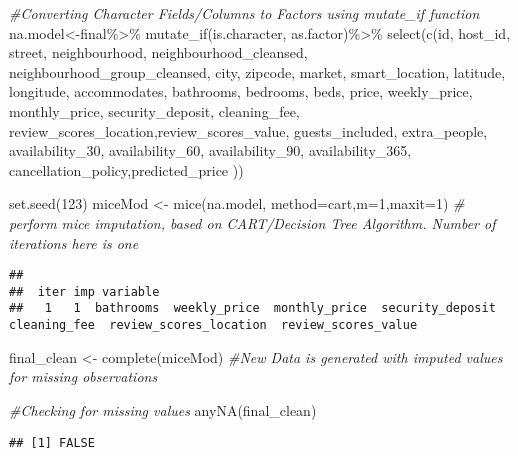 \documentclass[
]{article}
\newenvironment{Shaded}{\begin{snugshade}}{\end{snugshade}}
\newcommand{\AttributeTok}[1]{\textcolor[rgb]{0.77,0.63,0.00}{#1}}
\newcommand{\CommentTok}[1]{\textcolor[rgb]{0.56,0.35,0.01}{\textit{#1}}}
\newcommand{\DecValTok}[1]{\textcolor[rgb]{0.00,0.00,0.81}{#1}}
\newcommand{\FunctionTok}[1]{\textcolor[rgb]{0.00,0.00,0.00}{#1}}
\newcommand{\NormalTok}[1]{#1}
\newcommand{\OtherTok}[1]{\textcolor[rgb]{0.56,0.35,0.01}{#1}}
\newcommand{\SpecialCharTok}[1]{\textcolor[rgb]{0.00,0.00,0.00}{#1}}
\newcommand{\StringTok}[1]{\textcolor[rgb]{0.31,0.60,0.02}{#1}}
\begin{document}
\begin{Shaded}
\begin{Highlighting}[]
\CommentTok{\#Converting Character Fields/Columns to Factors using \textquotesingle{}mutate\_if\textquotesingle{} function}
\NormalTok{na.model}\OtherTok{\textless{}{-}}\NormalTok{final}\SpecialCharTok{\%\textgreater{}\%}
  \FunctionTok{mutate\_if}\NormalTok{(is.character, as.factor)}\SpecialCharTok{\%\textgreater{}\%}
  \FunctionTok{select}\NormalTok{(}\FunctionTok{c}\NormalTok{(id, host\_id, street, neighbourhood, neighbourhood\_cleansed, neighbourhood\_group\_cleansed,   city,   zipcode,    market, smart\_location, latitude,   longitude, accommodates, bathrooms, bedrooms, beds, price, weekly\_price, monthly\_price, security\_deposit,  cleaning\_fee, review\_scores\_location,review\_scores\_value,  guests\_included, extra\_people, availability\_30, availability\_60, availability\_90, availability\_365, cancellation\_policy,predicted\_price ))}

\FunctionTok{set.seed}\NormalTok{(}\DecValTok{123}\NormalTok{)}
\NormalTok{miceMod }\OtherTok{\textless{}{-}} \FunctionTok{mice}\NormalTok{(na.model, }\AttributeTok{method=}\StringTok{\textquotesingle{}cart\textquotesingle{}}\NormalTok{,}\AttributeTok{m=}\DecValTok{1}\NormalTok{,}\AttributeTok{maxit=}\DecValTok{1}\NormalTok{)  }\CommentTok{\# perform mice imputation, based on CART/Decision Tree Algorithm. Number of iterations here is one}
\end{Highlighting}
\end{Shaded}

\begin{verbatim}
## 
##  iter imp variable
##   1   1  bathrooms  weekly_price  monthly_price  security_deposit  cleaning_fee  review_scores_location  review_scores_value
\end{verbatim}

\begin{Shaded}
\begin{Highlighting}[]
\NormalTok{final\_clean }\OtherTok{\textless{}{-}} \FunctionTok{complete}\NormalTok{(miceMod) }\CommentTok{\#New Data is generated with imputed values for missing observations}

\CommentTok{\#Checking for missing values}
\FunctionTok{anyNA}\NormalTok{(final\_clean)}
\end{Highlighting}
\end{Shaded}

\begin{verbatim}
## [1] FALSE
\end{verbatim}
\end{document}
